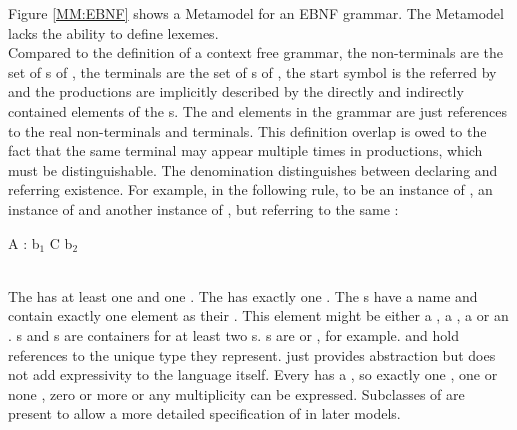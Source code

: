 Figure \ref{MM:EBNF} shows a Metamodel for an EBNF grammar. The Metamodel lacks the ability to define lexemes.  \\
Compared to the definition of a context free grammar, the non-terminals are the set of s of , the terminals are the set of s of , the start symbol is the  referred by  and the productions are implicitly described by the directly and indirectly contained elements of the s. The  and  elements in the grammar are just references to the real non-terminals and terminals. This definition overlap is owed to the fact that the same terminal may appear multiple times in productions, which must be distinguishable. The denomination distinguishes between declaring and referring existence. For example, in the following rule,  to be an instance of ,  an instance of  and  another instance of , but referring to the same :
\\\begin{code}
A : b$_1$ C b$_2$
\end{code}\\

The  has at least one  and one . The  has exactly one . The s have a name and contain exactly one element as their . This element might be either a , a , a  or an . s and s are containers for at least two s. s are  or , for example.  and  hold references to the unique type they represent.  just provides abstraction but does not add expressivity to the language itself. Every  has a , so exactly one , one or none , zero or more \code{+} or any multiplicity \code{*} can be expressed. Subclasses of  are present to allow a more detailed specification of  in later models.



